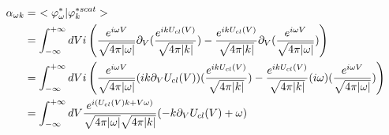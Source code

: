 \begin{eqnarray*}
    \alpha_{\omega k} &=~ <\varphi^*_{\omega}|\varphi^{*scat}_k> \\
    &=\int_{-\infty}^{+\infty} dV i\left(\frac{e^{i \omega V}}{\sqrt{4\pi|\omega|}}\partial_V(\frac{e^{i k U_{cl}(V)}}{\sqrt{4\pi|k|}})-\frac{e^{i k U_{cl}(V)}}{\sqrt{4\pi|k|}}\partial_V(\frac{e^{i \omega V}}{\sqrt{4\pi|\omega|}})\right)\\
    &=\int_{-\infty}^{+\infty} dV i\left(\frac{e^{i \omega V}}{\sqrt{4\pi|\omega|}}(ik\partial_VU_{cl}(V))(\frac{e^{i k U_{cl}(V)}}{\sqrt{4\pi|k|}})-\frac{e^{i k U_{cl}(V)}}{\sqrt{4\pi|k|}}(i\omega)(\frac{e^{i \omega V}}{\sqrt{4\pi|\omega|}})\right)\\
    &=\int_{-\infty}^{+\infty} dV \frac{e^{i(U_{cl}(V)k+V\omega)}}{\sqrt{4\pi|\omega|}\sqrt{4\pi |k|}}(-k\partial_V U_{cl}(V)+\omega)\\
\end{eqnarray*}